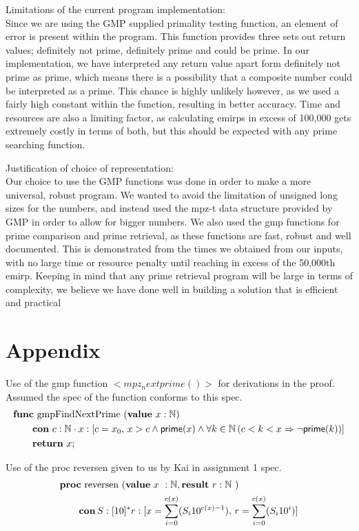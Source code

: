 \documentclass[a4paper,10pt,fleqn]{scrartcl}   	%
\newcommand{\Prime}{\mathsf{prime}}
\begin{document}
Limitations of the current program implementation: \\
Since we are using the GMP supplied primality testing function, an element of error is present within the program. This function provides three sets out return values; definitely not prime, definitely prime and could be prime. In our implementation, we have interpreted any return value apart form definitely not prime as prime, which means there is a possibility that a composite number could be interpreted as a prime. This chance is highly unlikely however, as we used a fairly high constant within the function, resulting in better accuracy. Time and resources are also a limiting factor, as calculating emirps in excess of 100,000 gets extremely costly in terms of both, but this should be expected with any prime searching function.

Justification of choice of representation: \\
Our choice to use the GMP functions was done in order to make a more universal, robust program. We wanted to avoid the limitation of unsigned long sizes for the numbers, and instead used the mpz-t data structure provided by GMP in order to allow for bigger numbers. We also used the gmp functions for prime comparison and prime retrieval, as these functions are fast, robust and well documented. This is demonstrated from the times we obtained from our inputs, with no large time or resource penalty until reaching in excess of the 50,000th emirp. Keeping in mind that any prime retrieval program will be large in terms of complexity, we believe we have done well in building a solution that is efficient and practical
\newpage
\section{Appendix}
\label{appendix}

Use of the gmp function $<mpz_nextprime()>$ for derivations in the proof. Assumed the spec of the function conforms to this spec.
\begin{align*}
&\FUNC \text{ gmpFindNextPrime }(\VALUE \text{ $x$}: \nat) \\
	&\qquad \CON \text{ $c$}: \nat \cdot{} x : [c=x_0, \, x>c \And \Prime(x) \And \All{k\in \nat}{c<k<x \Implies \NOT \Prime(k)}] \\
	&\qquad \RETURN \text{ $x$};
\end{align*}

Use of the proc reversen given to us by Kai in assignment 1 spec.
\begin{align*}
&\text{\normalfont\bfseries proc} \text{ reversen }(\text{\normalfont\bfseries value} \text{ $x$ }: \mathbb{N}, \text{\normalfont\bfseries result} \text{ $r: \mathbb{N}$ }) \\
	&\qquad \text{\normalfont\bfseries con} \, S:[10]^{*} r : [x=\sum_{i=0}^{c(x)} (S_i 10^{c(x)-1}), \, r = \sum_{i = 0}^{c(x)} (S_i 10^{i})]
\end{align*}
\end{document}
